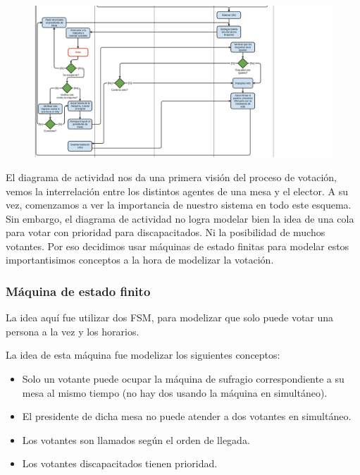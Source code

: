 \begin{figure}[h!]
\centering
\includegraphics[scale=0.5]{imagenes/actividad/actividadSufragio2}
\end{figure}

\newpage

El diagrama de actividad nos da una primera visión del proceso de votación, vemos la interrelación entre los distintos agentes de una mesa y el elector. A su vez, comenzamos a ver la importancia de nuestro sistema en todo este esquema. Sin embargo, el diagrama de actividad no logra modelar bien la idea de una cola para votar con prioridad para discapacitados. Ni la posibilidad de muchos votantes. Por eso decidimos usar máquinas de estado finitas para modelar estos importantisimos conceptos a la hora de modelizar la votación.


\newpage
\subsubsection{Máquina de estado finito}

La idea aquí fue utilizar dos FSM, para modelizar que solo puede votar una persona a la vez y los horarios.


La idea de esta máquina fue modelizar los siguientes conceptos:
\begin{itemize}
\item Solo un votante puede ocupar la máquina de sufragio correspondiente a su mesa al mismo tiempo (no hay dos usando la máquina en simultáneo).
\item El presidente de dicha mesa no puede atender a dos votantes en simultáneo.
\item Los votantes son llamados según el orden de llegada.
\item Los votantes discapacitados tienen prioridad.

\end{itemize}

